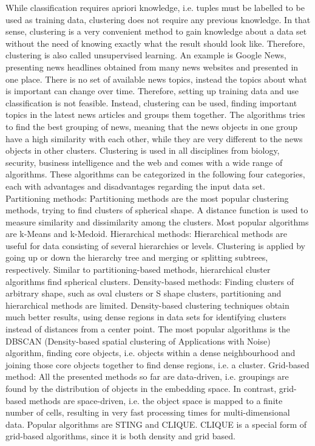 While classification requires apriori knowledge, i.e. tuples must be labelled to be used as training data, clustering does not require any previous knowledge. In that sense, clustering is a very convenient method to gain knowledge about a data set without the need of knowing exactly what the result should look like. Therefore, clustering is also called unsupervised learning.
An example is Google News, presenting news headlines obtained from many news websites and presented in one place. There is no set of available news topics, instead the topics about what is important can change over time. Therefore, setting up training data and use classification is not feasible. Instead, clustering can be used, finding important topics in the latest news articles and groups them together. The algorithms tries to find the best grouping of news, meaning that the news objects in one group have a high similarity with each other, while they are very different to the news objects in other clusters. 
Clustering is used in all disciplines from biology, security, business intelligence and the web and comes with a wide range of algorithms. These algorithms can be categorized in the following four categories, each with advantages and disadvantages regarding the input data set.
Partitioning methods: Partitioning methods are the most popular clustering methods, trying to find clusters of spherical shape. A distance function is used to measure similarity and dissimilarity among the clusters. Most popular algorithms are k-Means and k-Medoid. 
Hierarchical methods: Hierarchical methods are useful for data consisting of several hierarchies or levels. Clustering is applied by going up or down the hierarchy tree and merging or splitting subtrees, respectively. Similar to partitioning-based methods, hierarchical cluster algorithms find spherical clusters. 
Density-based methods: Finding clusters of arbitrary shape, such as oval clusters or S shape clusters, partitioning and hierarchical methods are limited. Density-based clustering techniques obtain much better results, using dense regions in data sets for identifying clusters instead of distances from a center point. The most popular algorithms is the DBSCAN (Density-based spatial clustering of Applications with Noise) algorithm, finding core objects, i.e. objects within a dense neighbourhood and joining those core objects together to find dense regions, i.e. a cluster.
Grid-based method: All the presented methods so far are data-driven, i.e. groupings are found by the distribution of objects in the embedding space. In contrast, grid-based methods are space-driven, i.e. the object space is mapped to a finite number of cells, resulting in very fast processing times for multi-dimensional data. Popular algorithms are STING and CLIQUE. CLIQUE is a special form of grid-based algorithms, since it is both density and grid based.


